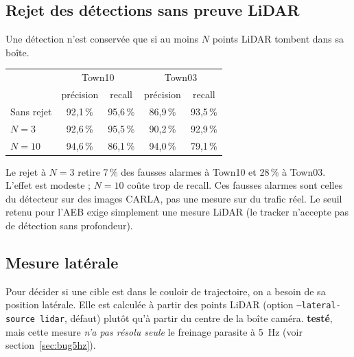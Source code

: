 \documentclass[11pt,a4paper]{article}
\newcommand{\teste}{\textcolor{accent}{\textbf{test\'e}}}
\newcommand{\code}[1]{\texttt{#1}}
\begin{document}
\subsection{Rejet des d\'etections sans preuve LiDAR}
Une d\'etection n'est conserv\'ee que si au moins $N$ points LiDAR tombent dans sa bo\^ite.
\begin{center}\small\begin{tabular}{@{}lcccc@{}}\toprule
 & \multicolumn{2}{c}{Town10} & \multicolumn{2}{c}{Town03} \\
 & pr\'ecision & recall & pr\'ecision & recall \\\midrule
Sans rejet & 92,1\,\% & 95,6\,\% & 86,9\,\% & 93,5\,\% \\
$N=3$ & 92,6\,\% & 95,5\,\% & 90,2\,\% & 92,9\,\% \\
$N=10$ & 94,6\,\% & 86,1\,\% & 94,0\,\% & 79,1\,\% \\
\bottomrule\end{tabular}\end{center}
Le rejet \`a $N=3$ retire 7\,\% des fausses alarmes \`a Town10 et 28\,\% \`a Town03. L'effet est modeste ; $N=10$ co\^ute trop de recall.
Ces fausses alarmes sont celles du d\'etecteur sur des images CARLA, pas une mesure sur du trafic r\'eel. Le seuil retenu pour l'AEB exige simplement une
mesure LiDAR (le tracker n'accepte pas de d\'etection sans profondeur).

\subsection{Mesure lat\'erale}
Pour d\'ecider si une cible est dans le couloir de trajectoire, on a besoin de sa position lat\'erale. Elle est calcul\'ee \`a partir des points LiDAR
(option \code{--lateral-source lidar}, d\'efaut) plut\^ot qu'\`a partir du centre de la bo\^ite cam\'era. \teste, mais cette mesure \emph{n'a pas r\'esolu seule}
le freinage parasite \`a 5~Hz (voir section~\ref{sec:bug5hz}).

\end{document}
